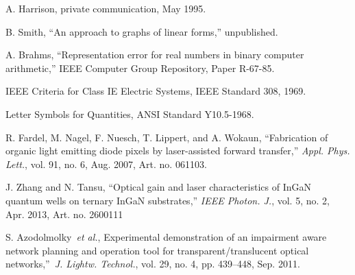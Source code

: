\documentclass{ieeeaccess}
\begin{document}
\begin{thebibliography}{00}
 A. Harrison, private communication, May 1995.

 B. Smith, ``An approach to graphs of linear forms,'' unpublished.

 A. Brahms, ``Representation error for real numbers in binary computer arithmetic,'' IEEE Computer Group Repository, Paper R-67-85.

 IEEE Criteria for Class IE Electric Systems, IEEE Standard 308, 1969.

 Letter Symbols for Quantities, ANSI Standard Y10.5-1968.

 R. Fardel, M. Nagel, F. Nuesch, T. Lippert, and A. Wokaun, ``Fabrication of organic light emitting diode pixels by laser-assisted forward transfer,'' \emph{Appl. Phys. Lett.}, vol. 91, no. 6, Aug. 2007, Art. no. 061103.~

 J. Zhang and N. Tansu, ``Optical gain and laser characteristics of InGaN quantum wells on ternary InGaN substrates,'' \emph{IEEE Photon. J.}, vol. 5, no. 2, Apr. 2013, Art. no. 2600111

 S. Azodolmolky~\emph{et al.}, Experimental demonstration of an impairment aware network planning and operation tool for transparent/translucent optical networks,''~\emph{J. Lightw. Technol.}, vol. 29, no. 4, pp. 439--448, Sep. 2011.

\end{thebibliography}

\end{document}
